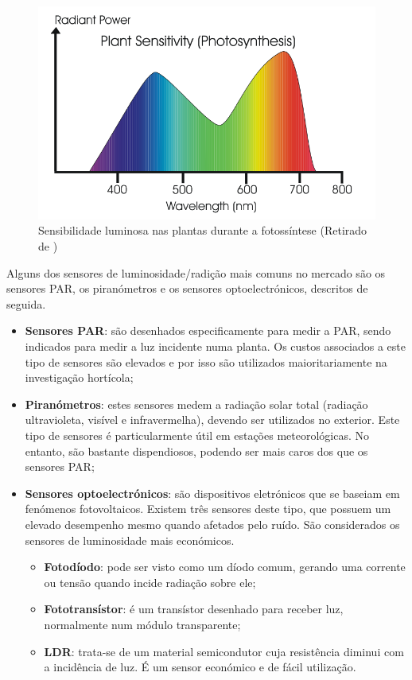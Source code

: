 \begin{figure}[!htb]
	\centering
	\includegraphics[scale=0.28]{img/plantagrap.png}
	\caption[Sensibilidade luminosa das plantas durante a fotossíntese]{Sensibilidade luminosa nas plantas durante a fotossíntese (Retirado de \cite{Argus2010})}
	\label{grapFoto}
\end{figure}

Alguns dos sensores de luminosidade/radição mais comuns no mercado são os sensores \ac{PAR}, os piranómetros e os sensores optoelectrónicos, descritos de seguida. 

\begin{itemize}
	\item \textbf{Sensores \ac{PAR}}: são desenhados especificamente para medir a \ac{PAR}, sendo indicados para medir a luz incidente numa planta. Os custos associados a este tipo de sensores são elevados e por isso são utilizados maioritariamente na investigação hortícola; 
	
	\item \textbf{Piranómetros}: estes sensores medem a radiação solar total (radiação ultravioleta, visível e infravermelha), devendo ser utilizados no exterior. Este tipo de sensores é particularmente útil em estações meteorológicas. No entanto, são bastante dispendiosos, podendo ser mais caros dos que os sensores \ac{PAR}; 

	\item \textbf{Sensores optoelectrónicos}: são dispositivos eletrónicos que se baseiam em fenómenos fotovoltaicos. Existem três sensores deste tipo, que possuem um elevado desempenho mesmo quando afetados pelo ruído. São considerados os sensores de luminosidade mais económicos.  
	 
		\begin{itemize}
			\item \textbf{Fotodíodo}: pode ser visto como um díodo comum, gerando uma corrente ou tensão quando incide radiação sobre ele; 
			\item \textbf{Fototransístor}: é um transístor desenhado para receber luz, normalmente num módulo transparente; 
			\item \textbf{\ac{LDR}}: trata-se de um material semicondutor cuja resistência diminui com a incidência de luz. É um sensor económico e de fácil utilização. 
		\end{itemize}
	
\end{itemize}

